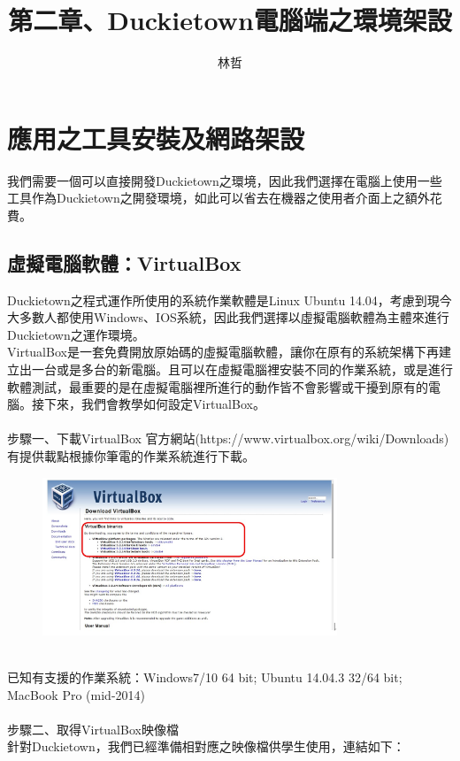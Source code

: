 \documentclass{article}
\title{第二章、Duckietown電腦端之環境架設}
\author{林哲}
\date{} %
\begin{document}
\maketitle

\section{應用之工具安裝及網路架設}

我們需要一個可以直接開發Duckietown之環境，因此我們選擇在電腦上使用一些工具作為Duckietown之開發環境，如此可以省去在機器之使用者介面上之額外花費。
\subsection{虛擬電腦軟體：VirtualBox}

Duckietown之程式運作所使用的系統作業軟體是Linux Ubuntu 14.04，考慮到現今大多數人都使用Windows、IOS系統，因此我們選擇以虛擬電腦軟體為主體來進行Duckietown之運作環境。
\\VirtualBox是一套免費開放原始碼的虛擬電腦軟體，讓你在原有的系統架構下再建立出一台或是多台的新電腦。且可以在虛擬電腦裡安裝不同的作業系統，或是進行軟體測試，最重要的是在虛擬電腦裡所進行的動作皆不會影響或干擾到原有的電腦。接下來，我們會教學如何設定VirtualBox。
\\
\\步驟一、下載VirtualBox
官方網站(https://www.virtualbox.org/wiki/Downloads)有提供載點根據你筆電的作業系統進行下載。
\\
\begin{figure}[htp]
    \begin{center}
        \includegraphics[width=250pt]{pic/圖片1.jpg}
    \end{center}
\end{figure}
\\
已知有支援的作業系統：Windows7/10 64 bit; Ubuntu 14.04.3 32/64 bit; MacBook Pro (mid-2014)
\\\\步驟二、取得VirtualBox映像檔
\\針對Duckietown，我們已經準備相對應之映像檔供學生使用，連結如下：
\end{document}
